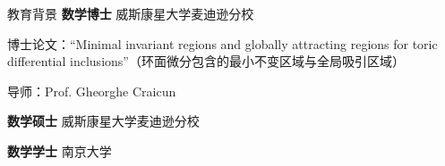 \begin{rubric}{教育背景}
\entry*[2016 -- 2020]%
	\textbf{数学博士} \hfill 威斯康星大学麦迪逊分校\par
	博士论文：``Minimal invariant regions and globally attracting regions for toric differential inclusions''（环面微分包含的最小不变区域与全局吸引区域）\par
	导师：Prof. Gheorghe Craicun

\entry*[2015 -- 2016]%
	\textbf{数学硕士} \hfill 威斯康星大学麦迪逊分校

\entry*[2011 -- 2015]%
	\textbf{数学学士} \hfill 南京大学
\end{rubric}
